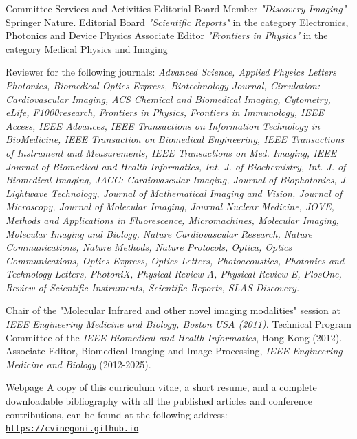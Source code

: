 \documentclass{resume}
\begin{document}
%
%
\begin{category}{Committee Services and Activities}
\citembullet 
Editorial Board Member {\it "Discovery Imaging"} Springer Nature.
\citembullet 
Editorial Board {\it "Scientific Reports"} in the category Electronics, Photonics and Device Physics
\citembullet 
Associate Editor {\it "Frontiers in Physics"} in the category Medical Physics and Imaging

\citembullet 
Reviewer for the following journals: {\it Advanced Science, Applied Physics Letters Photonics, Biomedical Optics Express, Biotechnology Journal, Circulation: Cardiovascular Imaging, ACS Chemical and Biomedical Imaging, Cytometry, eLife, F1000research, Frontiers in Physics, Frontiers in Immunology, IEEE Access, IEEE Advances, IEEE Transactions on Information Technology in BioMedicine,  IEEE Transaction on Biomedical Engineering, IEEE Transactions of Instrument and Measurements, IEEE Transactions on Med. Imaging,  IEEE Journal of Biomedical and Health Informatics, Int. J. of Biochemistry, Int. J. of Biomedical Imaging, JACC: Cardiovascular Imaging, Journal of Biophotonics, J. Lightwave Technology, Journal of Mathematical Imaging and Vision, Journal of Microscopy, Journal of Molecular Imaging, Journal Nuclear Medicine, JOVE,  Methods and Applications in Fluorescence, Micromachines, Molecular Imaging, Molecular Imaging and Biology, Nature Cardiovascular Research, Nature Communications, Nature Methods, Nature Protocols, Optica, Optics Communications, Optics Express, Optics Letters, Photoacoustics, Photonics and Technology Letters, PhotoniX, Physical Review A, Physical Review E, PlosOne, Review of Scientific Instruments, Scientific Reports, SLAS Discovery.}

\citembullet 
Chair of the "Molecular Infrared and other novel imaging modalities" session at {\it IEEE Engineering Medicine and Biology, Boston USA (2011). }
\citembullet 
Technical Program Committee of the {\it IEEE Biomedical and Health Informatics}, Hong Kong (2012).
\citembullet 
Associate Editor, Biomedical Imaging and Image Processing, {\it IEEE Engineering Medicine and Biology} (2012-2025).
\end{category}

\begin{category}{Webpage}
 \citemnobullet 
A copy of this curriculum vitae, a short
resume, and a complete downloadable bibliography with all the
published articles and conference contributions, can be found at the
following address:
\newline
    \mbox{\small\tt \url{https://cvinegoni.github.io}}
\end{category}
\end{document}
